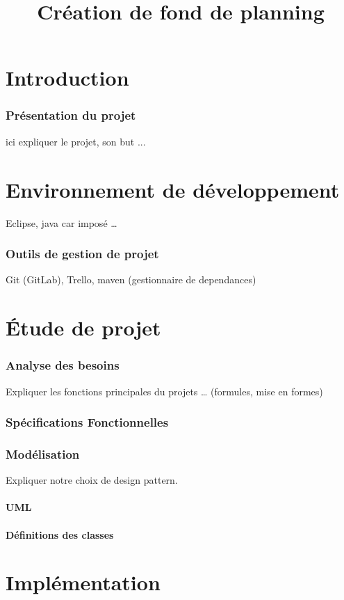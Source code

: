 \documentclass{polytech/polytech}
\title{Création de fond de planning}
\begin{document}
	\part{Introduction}
	\section{Présentation du projet}
	ici expliquer le projet, son but ...
	
	\part{Environnement de développement}
	Eclipse, java car imposé …
		
	\section{Outils de gestion de projet}
	Git (GitLab), Trello, maven (gestionnaire de dependances)
	
	\part{Étude de projet}
	\section{Analyse des besoins}
	Expliquer les fonctions principales du projets … (formules, mise en formes)
	
	\section{Spécifications Fonctionnelles}
	\section{Modélisation}
	Expliquer notre choix de design pattern.
	
	\subsection{UML}
	
	\subsection{Définitions des classes}
	
	\part{Implémentation}
	
\end{document}
